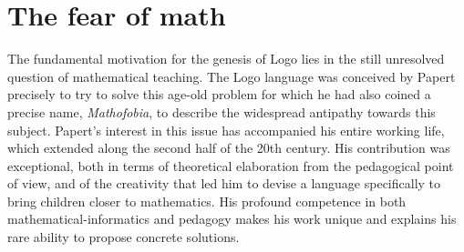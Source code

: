 \chapter{The fear of math} \label{cap:papert}

The fundamental motivation for the genesis of Logo lies in the still unresolved question of mathematical teaching. The Logo language was conceived by Papert precisely to try to solve this age-old problem for which he had also coined a precise name, \textit{Mathofobia}, to describe the widespread antipathy towards this subject. Papert's interest in this issue has accompanied his entire working life, which  extended along the second half of the 20th century. His contribution was exceptional, both in terms of theoretical elaboration from the pedagogical point of view, and of the creativity that led him to devise a language specifically to bring children closer to mathematics. His profound competence in both mathematical-informatics and pedagogy makes his work unique and explains his rare ability to propose concrete solutions.


